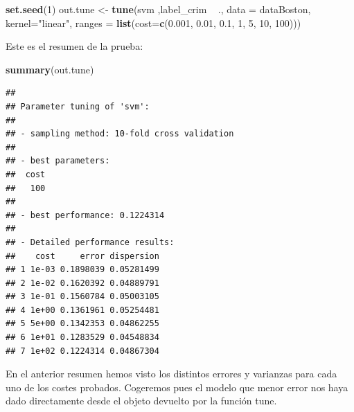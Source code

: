\documentclass[]{article}
\newenvironment{Shaded}{\begin{snugshade}}{\end{snugshade}}
\newcommand{\KeywordTok}[1]{\textcolor[rgb]{0.13,0.29,0.53}{\textbf{{#1}}}}
\newcommand{\DataTypeTok}[1]{\textcolor[rgb]{0.13,0.29,0.53}{{#1}}}
\newcommand{\DecValTok}[1]{\textcolor[rgb]{0.00,0.00,0.81}{{#1}}}
\newcommand{\FloatTok}[1]{\textcolor[rgb]{0.00,0.00,0.81}{{#1}}}
\newcommand{\StringTok}[1]{\textcolor[rgb]{0.31,0.60,0.02}{{#1}}}
\newcommand{\NormalTok}[1]{{#1}}
\begin{document}
\begin{Shaded}
\begin{Highlighting}[]
\KeywordTok{set.seed}\NormalTok{(}\DecValTok{1}\NormalTok{)}
\NormalTok{out.tune <-}\StringTok{ }\KeywordTok{tune}\NormalTok{(svm ,label_crim ~}\StringTok{ }\NormalTok{., }\DataTypeTok{data =} \NormalTok{dataBoston, }\DataTypeTok{kernel=}\StringTok{"linear"}\NormalTok{, }
                 \DataTypeTok{ranges =} \KeywordTok{list}\NormalTok{(}\DataTypeTok{cost=}\KeywordTok{c}\NormalTok{(}\FloatTok{0.001}\NormalTok{, }\FloatTok{0.01}\NormalTok{, }\FloatTok{0.1}\NormalTok{, }\DecValTok{1}\NormalTok{, }\DecValTok{5}\NormalTok{, }\DecValTok{10}\NormalTok{, }\DecValTok{100}\NormalTok{)))}
\end{Highlighting}
\end{Shaded}

Este es el resumen de la prueba:

\begin{Shaded}
\begin{Highlighting}[]
\KeywordTok{summary}\NormalTok{(out.tune)}
\end{Highlighting}
\end{Shaded}

\begin{verbatim}
## 
## Parameter tuning of 'svm':
## 
## - sampling method: 10-fold cross validation 
## 
## - best parameters:
##  cost
##   100
## 
## - best performance: 0.1224314 
## 
## - Detailed performance results:
##    cost     error dispersion
## 1 1e-03 0.1898039 0.05281499
## 2 1e-02 0.1620392 0.04889791
## 3 1e-01 0.1560784 0.05003105
## 4 1e+00 0.1361961 0.05254481
## 5 5e+00 0.1342353 0.04862255
## 6 1e+01 0.1283529 0.04548834
## 7 1e+02 0.1224314 0.04867304
\end{verbatim}

En el anterior resumen hemos visto los distintos errores y varianzas
para cada uno de los costes probados. Cogeremos pues el modelo que menor
error nos haya dado directamente desde el objeto devuelto por la función
tune.

\begin{Shaded}
\end{Shaded}
\end{document}
